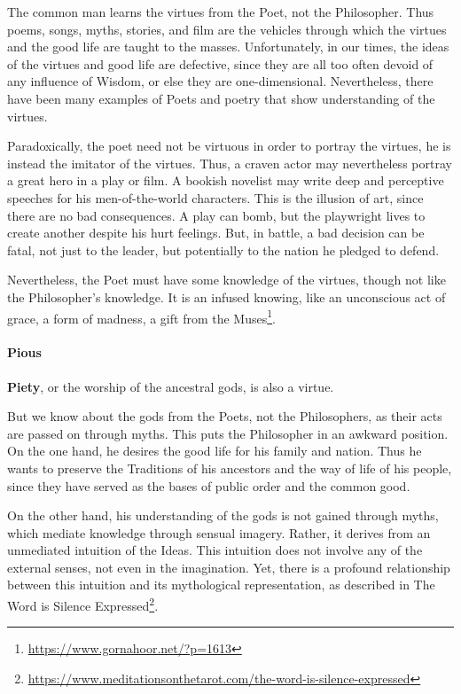 The common man learns the virtues from the Poet, not the Philosopher. Thus poems, songs, myths, stories, and film are the vehicles through which the virtues and the good life are taught to the masses. Unfortunately, in our times, the ideas of the virtues and good life are defective, since they are all too often devoid of any influence of Wisdom, or else they are one-dimensional. Nevertheless, there have been many examples of Poets and poetry that show understanding of the virtues.

Paradoxically, the poet need not be virtuous in order to portray the virtues, he is instead the imitator of the virtues. Thus, a craven actor may nevertheless portray a great hero in a play or film. A bookish novelist may write deep and perceptive speeches for his men-of-the-world characters. This is the illusion of art, since there are no bad consequences. A play can bomb, but the playwright lives to create another despite his hurt feelings. But, in battle, a bad decision can be fatal, not just to the leader, but potentially to the nation he pledged to defend.

Nevertheless, the Poet must have some knowledge of the virtues, though not like the Philosopher's knowledge. It is an infused knowing, like an unconscious act of grace, a form of madness, a gift from the Muses\footnote{\url{https://www.gornahoor.net/?p=1613}}.

\paragraph{Pious}


\textbf{Piety}, or the worship of the ancestral gods, is also a virtue.

But we know about the gods from the Poets, not the Philosophers, as their acts are passed on through myths. This puts the Philosopher in an awkward position. On the one hand, he desires the good life for his family and nation. Thus he wants to preserve the Traditions of his ancestors and the way of life of his people, since they have served as the bases of public order and the common good.

On the other hand, his understanding of the gods is not gained through myths, which mediate knowledge through sensual imagery. Rather, it derives from an unmediated intuition of the Ideas. This intuition does not involve any of the external senses, not even in the imagination. Yet, there is a profound relationship between this intuition and its mythological representation, as described in The Word is Silence Expressed\footnote{\url{https://www.meditationsonthetarot.com/the-word-is-silence-expressed}}.



